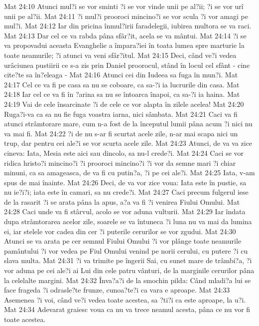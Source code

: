 Mat 24:10  Atunci mul?i se vor sminti ?i se vor vinde unii pe al?ii; ?i se vor urî unii pe al?ii.
Mat 24:11  ?i mul?i prooroci mincino?i se vor scula ?i vor amagi pe mul?i.
Mat 24:12  Iar din pricina înmul?irii faradelegii, iubirea multora se va raci.
Mat 24:13  Dar cel ce va rabda pâna sfâr?it, acela se va mântui.
Mat 24:14  ?i se va propovadui aceasta Evanghelie a împara?iei în toata lumea spre marturie la toate neamurile; ?i atunci va veni sfâr?itul.
Mat 24:15  Deci, când ve?i vedea urâciunea pustiirii ce s-a zis prin Daniel proorocul, stând în locul cel sfânt - cine cite?te sa în?eleaga -
Mat 24:16  Atunci cei din Iudeea sa fuga în mun?i.
Mat 24:17  Cel ce va fi pe casa sa nu se coboare, ca sa-?i ia lucrurile din casa.
Mat 24:18  Iar cel ce va fi în ?arina sa nu se întoarca înapoi, ca sa-?i ia haina.
Mat 24:19  Vai de cele însarcinate ?i de cele ce vor alapta în zilele acelea!
Mat 24:20  Ruga?i-va ca sa nu fie fuga voastra iarna, nici sâmbata.
Mat 24:21  Caci va fi atunci strâmtorare mare, cum n-a fost de la începutul lumii pâna acum ?i nici nu va mai fi.
Mat 24:22  ?i de nu s-ar fi scurtat acele zile, n-ar mai scapa nici un trup, dar pentru cei ale?i se vor scurta acele zile.
Mat 24:23  Atunci, de va va zice cineva: Iata, Mesia este aici sau dincolo, sa nu-l crede?i.
Mat 24:24  Caci se vor ridica hristo?i mincino?i ?i prooroci mincino?i ?i vor da semne mari ?i chiar minuni, ca sa amageasca, de va fi cu putin?a, ?i pe cei ale?i.
Mat 24:25  Iata, v-am spus de mai înainte.
Mat 24:26  Deci, de va vor zice voua: Iata este în pustie, sa nu ie?i?i; iata este în camari, sa nu crede?i.
Mat 24:27  Caci precum fulgerul iese de la rasarit ?i se arata pâna la apus, a?a va fi ?i venirea Fiului Omului.
Mat 24:28  Caci unde va fi stârvul, acolo se vor aduna vulturii.
Mat 24:29  Iar îndata dupa strâmtorarea acelor zile, soarele se va întuneca ?i luna nu va mai da lumina ei, iar stelele vor cadea din cer ?i puterile cerurilor se vor zgudui.
Mat 24:30  Atunci se va arata pe cer semnul Fiului Omului ?i vor plânge toate neamurile pamântului ?i vor vedea pe Fiul Omului venind pe norii cerului, cu putere ?i cu slava multa.
Mat 24:31  ?i va trimite pe îngerii Sai, cu sunet mare de trâmbi?a, ?i vor aduna pe cei ale?i ai Lui din cele patru vânturi, de la marginile cerurilor pâna la celelalte margini.
Mat 24:32  Înva?a?i de la smochin pilda: Când mladi?a lui se face frageda ?i odrasle?te frunze, cunoa?te?i ca vara e aproape.
Mat 24:33  Asemenea ?i voi, când ve?i vedea toate acestea, sa ?ti?i ca este aproape, la u?i.
Mat 24:34  Adevarat graiesc voua ca nu va trece neamul acesta, pâna ce nu vor fi toate acestea.
